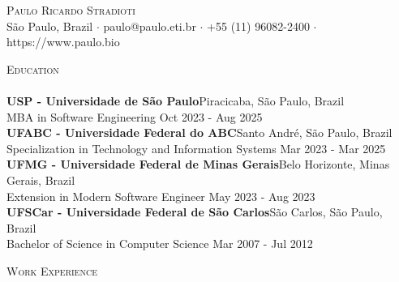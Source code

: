 \documentclass[a4paper]{article}
\newcommand{\lineunder} {
    \vspace*{-8pt} \\
    \hspace*{-18pt} \hrulefill \\
}
\newcommand{\header} [1] {
    {\hspace*{-18pt}\vspace*{6pt} \textsc{#1}}
    \vspace*{-6pt} \lineunder
}
\begin{document}
\vspace*{-40pt}

    

\vspace*{-10pt}
\begin{center}
	{\Huge \scshape {Paulo Ricardo Stradioti}}\\
	São Paulo, Brazil $\cdot$ paulo@paulo.eti.br $\cdot$ +55 (11) 96082-2400 $\cdot$ https://www.paulo.bio\\
\end{center}

\header{Education}
\textbf{USP - Universidade de São Paulo}\hfill Piracicaba, São Paulo, Brazil\\
MBA in Software Engineering \hfill Oct 2023 - Aug 2025\\
\vspace{2mm}
\textbf{UFABC - Universidade Federal do ABC}\hfill Santo André, São Paulo, Brazil\\
Specialization in Technology and Information Systems \hfill Mar 2023 - Mar 2025\\
\vspace{2mm}
\textbf{UFMG - Universidade Federal de Minas Gerais}\hfill Belo Horizonte, Minas Gerais, Brazil\\
Extension in Modern Software Engineer \hfill May 2023 - Aug 2023\\
\vspace{2mm}
\textbf{UFSCar - Universidade Federal de São Carlos}\hfill São Carlos, São Paulo, Brazil\\
Bachelor of Science in Computer Science \hfill Mar 2007 - Jul 2012\\
\vspace{2mm}

\header{Work Experience}
\vspace{1mm}
\end{document}
